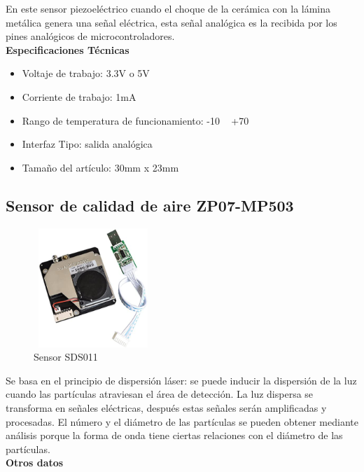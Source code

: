 En este sensor piezoeléctrico cuando el choque de la cerámica con la lámina metálica genera una señal eléctrica, esta señal analógica es la recibida por los pines analógicos de microcontroladores.\\

\textbf{Especificaciones Técnicas}

\begin{itemize}
    \item Voltaje de trabajo: 3.3V o 5V
    \item Corriente de trabajo: 1mA
    \item Rango de temperatura de funcionamiento: -10 ~ +70
    \item Interfaz Tipo: salida analógica
    \item Tamaño del artículo: 30mm x 23mm
\end{itemize}

\newpage

\subsection{Sensor de calidad de aire ZP07-MP503}

\vspace{1cm}

\begin{figure}[H]
      \centering
      \includegraphics[width=4.5cm, height=4.5cm]{imagenes/Sensor SDS011.jpg}
      \caption{Sensor SDS011}
      \label{imag:SDS011}
   \end{figure}

Se basa en el principio de dispersión láser: se puede inducir la dispersión de la luz cuando las partículas atraviesan el área de detección. La luz dispersa se transforma en señales eléctricas, después estas señales serán amplificadas y procesadas. El número y el diámetro de las partículas se pueden obtener mediante análisis porque la forma de onda tiene ciertas relaciones con el diámetro de las partículas.\\

\textbf{Otros datos}

